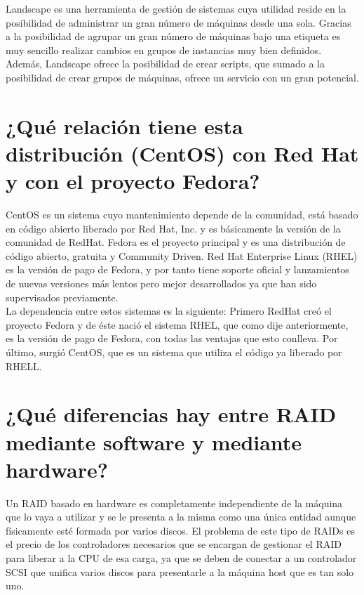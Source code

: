Landscape \cite{Landscape} es una herramienta de gestión de sistemas cuya utilidad reside en la posibilidad de administrar un gran número de máquinas desde una sola. Gracias a la posibilidad de agrupar un gran número de máquinas bajo una etiqueta es muy sencillo realizar cambios en grupos de instancias muy bien definidos. Además, Landscape ofrece la posibilidad de crear scripts, que sumado a la posibilidad de crear grupos de máquinas, ofrece un servicio con un gran potencial.


\section{¿Qué relación tiene esta distribución (CentOS) con Red Hat y con el proyecto Fedora?}
CentOS \cite{centOS} es un sistema cuyo mantenimiento depende de la comunidad, está basado en código abierto liberado por Red Hat, Inc. \cite{RedHat} y es básicamente la versión de la comunidad de RedHat.  
Fedora \cite{Fedora} es el proyecto principal y es una distribución de código abierto, gratuita y Community Driven.
Red Hat Enterprise Linux (RHEL) \cite{RHEL} es la versión de pago de Fedora, y por tanto tiene soporte oficial y lanzamientos de nuevas versiones más lentos pero mejor desarrollados ya que han sido supervisados previamente. \\ 

La dependencia entre estos sistemas es la siguiente:
Primero RedHat creó el proyecto Fedora y de éste nació el sistema RHEL, que como dije anteriormente, es la versión de pago de Fedora, con todas las ventajas que esto conlleva. Por último, surgió CentOS, que es un sistema que utiliza el código ya liberado por RHELL.


\section{¿Qué diferencias hay entre RAID mediante software y mediante hardware?}
Un RAID basado en hardware es completamente independiente de la máquina que lo vaya a utilizar y se le presenta a la misma como una única entidad aunque físicamente esté formada por varios discos. El problema de este tipo de RAIDs es el precio de los controladores necesarios que se encargan de gestionar el RAID para liberar a la CPU de esa carga, ya que se deben de conectar a un controlador SCSI que unifica varios discos para presentarle a la máquina host que es tan solo uno. \\

